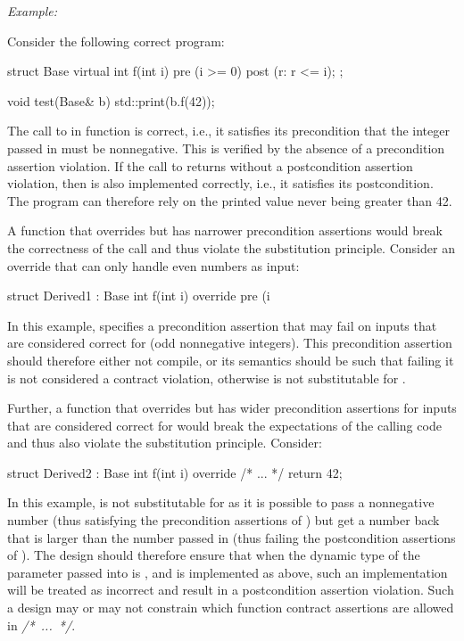 \emph{Example:}

Consider the following correct program:
\begin{codeblock}
struct Base {
  virtual int f(int i)
    pre (i >= 0)
    post (r: r <= i);
};

void test(Base& b) {
  std::print(b.f(42));
}
\end{codeblock}
The call to  in function  is correct, i.e., it satisfies its precondition that the integer passed in must be nonnegative. This is verified by the absence of a precondition assertion violation. If the call to  returns without a postcondition assertion violation, then  is also implemented correctly, i.e., it satisfies its postcondition. The program can therefore rely on  the printed value never being greater than 42.

A function that overrides  but has narrower precondition assertions would break the correctness of the call and thus violate the substitution principle. Consider an override that can only handle even numbers as input:
\begin{codeblock}
struct Derived1 : Base {
  int f(int i) override
    pre (i %
}
\end{codeblock}
In this example,  specifies a precondition assertion that may fail on inputs that are considered correct for  (odd nonnegative integers). This precondition assertion should therefore either not compile, or its semantics should be such that failing it is not considered a contract violation, otherwise  is not substitutable for .

Further, a function that overrides  but has wider precondition assertions for inputs that are considered correct for  would break the expectations of the calling code and thus also violate the substitution principle. Consider:

\begin{codeblock}
struct Derived2 : Base {
  int f(int i) override /* ... */ {
    return 42;
  }
}
\end{codeblock}

In this example,  is not substitutable for  as it is possible to pass a nonnegative number (thus satisfying the precondition assertions of ) but get a number back that is larger than the number passed in (thus failing the postcondition assertions of ). The design should therefore ensure that when the dynamic type of the parameter passed into   is , and  is implemented as above, such an implementation will be treated as incorrect and result in a postcondition assertion violation. Such a design may or may not constrain which function contract assertions are allowed in \mbox{\emph{/* ... */}}.

